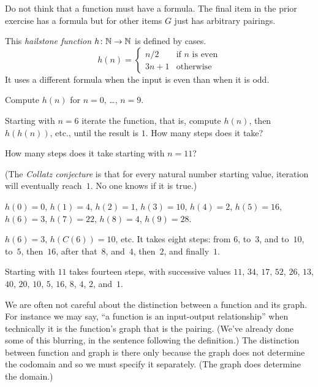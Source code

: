 \documentclass{ibl}  %
\begin{document}
Do not think that a function must have a formula.
The final item in the prior exercise has a formula but for other items 
$G$ just has arbitrary pairings.


\begin{problem}[\midlength]
This \textit{hailstone function} $\mbox{$h\colon \mathbb{N}\to \mathbb{N}$}$ is defined by cases.
\begin{equation*}
  h(n)=\begin{cases}
         n/2  &\text{if $n$ is even}  \\
         3n+1 &\text{otherwise}
       \end{cases}
\end{equation*}
It uses a different formula when the input is even than when it is odd.
\begin{items}
  \item Compute $h(n)$ for $n=0$, \ldots, $n=9$.
  \item Starting with $n=6$ iterate the function, that is, 
    compute $h(n)$, then $h(h(n))$, etc., until the result is $1$.
    How many steps does it take?
  \item How many steps does it take starting with $n=11$?
\end{items}
(The \textit{Collatz conjecture} is that for every natural number starting
value, iteration will eventually reach~$1$.
No one knows if it is true.)
\begin{answer}
\begin{items}
  \item $h(0)=0$, $h(1)=4$, $h(2)=1$, $h(3)=10$, $h(4)=2$, $h(5)=16$,
    $h(6)=3$, $h(7)=22$, $h(8)=4$, $h(9)=28$. 
  \item $h(6)=3$, $h(C(6))=10$, etc.
    It takes eight steps: from $6$, to~$3$, and to~$10$, to~$5$, 
    then~$16$, after that~$8$, and~$4$, then~$2$, and finally~$1$.
  \item Starting with $11$ takes fourteen steps, with successive 
    values $11$, $34$, $17$, $52$, $26$, $13$, $40$, $20$, $10$, $5$, 
    $16$, $8$, $4$, $2$, and~$1$.   
\end{items}
\end{answer}
\end{problem}

We are often not careful about the distinction between a function and its graph.
For instance we may say, ``a function is an input-output relationship'' 
when technically it is the function's graph that is the pairing.
(We've already done some of this blurring, 
in the sentence following the definition.)
The distinction between function and graph
is there only because the graph does not determine the codomain and
so we must specify it separately.
(The graph does determine the domain.)
\end{document}

